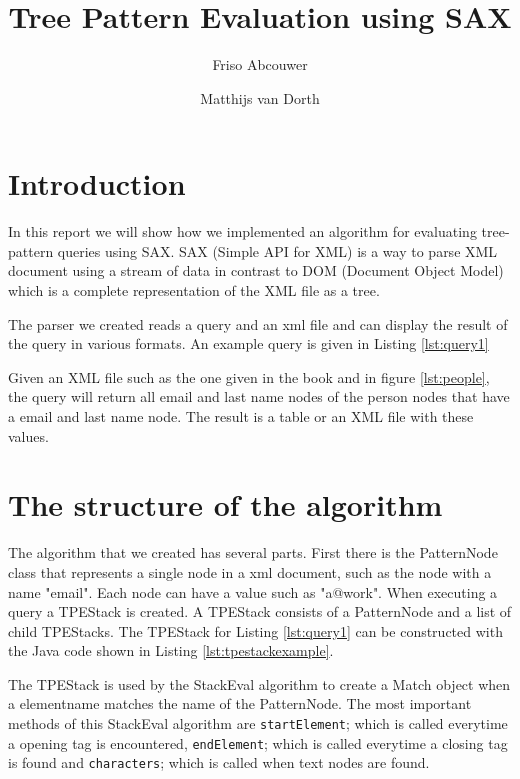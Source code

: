 \documentclass[11pt]{article}
\title{Tree Pattern Evaluation using SAX}
\author{Friso Abcouwer \and Matthijs van Dorth}
\begin{document}
\maketitle

\section{Introduction}
In this report we will show how we implemented an algorithm for evaluating tree-pattern queries using SAX. SAX (Simple API for XML) is a way to parse XML document using a stream of data in contrast to DOM (Document Object Model) which is a complete representation of the XML file as a tree.

The parser we created reads a query and an xml file and can display the result of the query in various formats. An example query is given in Listing \ref{lst:query1}



Given an XML file such as the one given in the book and in figure \ref{lst:people}, the query will return all email and last name nodes of the person nodes that have a email and last name node.
The result is a table or an XML file with these values.



\newpage
\section{The structure of the algorithm}
The algorithm that we created has several parts. First there is the PatternNode class that represents a single node in a xml document, such as the node with a name "email". Each node can have a value such as "a@work".
When executing a query a TPEStack is created. A TPEStack consists of a PatternNode and a list of child TPEStacks. The TPEStack for Listing \ref{lst:query1} can be constructed with the Java code shown in Listing \ref{lst:tpestackexample}. 



The TPEStack is used by the StackEval algorithm to create a Match object when a elementname matches the
name of the PatternNode. The most important methods of this StackEval algorithm are \lstinline{startElement}; which is called everytime a opening tag is encountered, \lstinline{endElement}; which is called everytime a closing tag is found and \lstinline{characters}; which is called when text nodes are found. 
\end{document}
